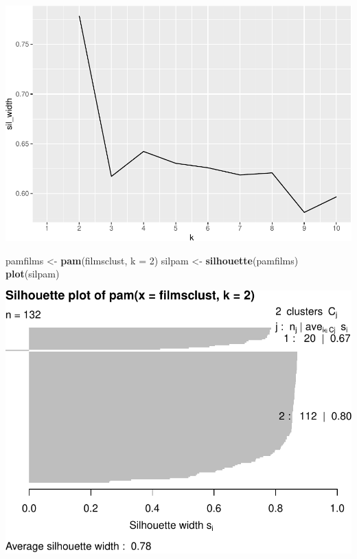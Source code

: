 \documentclass[]{article}
\newenvironment{Shaded}{\begin{snugshade}}{\end{snugshade}}
\newcommand{\DataTypeTok}[1]{\textcolor[rgb]{0.13,0.29,0.53}{#1}}
\newcommand{\DecValTok}[1]{\textcolor[rgb]{0.00,0.00,0.81}{#1}}
\newcommand{\KeywordTok}[1]{\textcolor[rgb]{0.13,0.29,0.53}{\textbf{#1}}}
\newcommand{\NormalTok}[1]{#1}
\newcommand{\StringTok}[1]{\textcolor[rgb]{0.31,0.60,0.02}{#1}}
\begin{document}
\begin{center}\includegraphics{project1.ethanpieniazekweb_files/figure-latex/unnamed-chunk-16-1} \end{center}

\begin{Shaded}
\begin{Highlighting}[]
\NormalTok{pamfilms <-}\StringTok{ }\KeywordTok{pam}\NormalTok{(filmsclust, }\DataTypeTok{k =} \DecValTok{2}\NormalTok{)}
\NormalTok{silpam <-}\StringTok{ }\KeywordTok{silhouette}\NormalTok{(pamfilms)}
\KeywordTok{plot}\NormalTok{(silpam)}
\end{Highlighting}
\end{Shaded}

\begin{center}\includegraphics{project1.ethanpieniazekweb_files/figure-latex/unnamed-chunk-16-2} \end{center}
\end{document}
